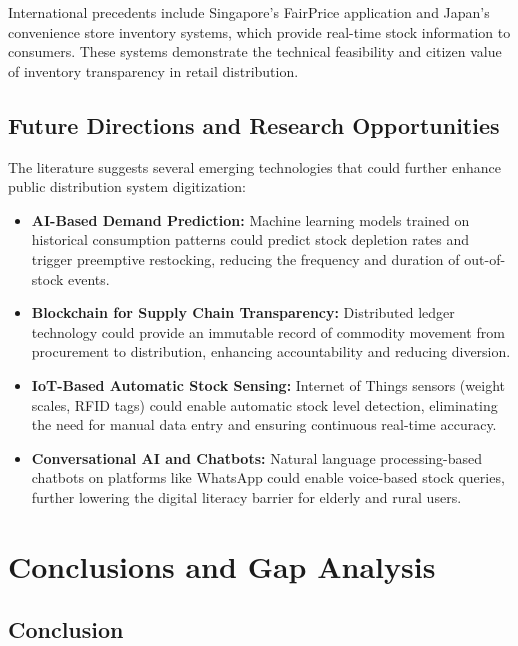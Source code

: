International precedents include Singapore's FairPrice application and Japan's convenience store inventory systems, which provide real-time stock information to consumers. These systems demonstrate the technical feasibility and citizen value of inventory transparency in retail distribution.

\subsection{Future Directions and Research Opportunities}

The literature suggests several emerging technologies that could further enhance public distribution system digitization:

\begin{itemize}
    \item \textbf{AI-Based Demand Prediction:} Machine learning models trained on historical consumption patterns could predict stock depletion rates and trigger preemptive restocking, reducing the frequency and duration of out-of-stock events.

    \item \textbf{Blockchain for Supply Chain Transparency:} Distributed ledger technology could provide an immutable record of commodity movement from procurement to distribution, enhancing accountability and reducing diversion.

    \item \textbf{IoT-Based Automatic Stock Sensing:} Internet of Things sensors (weight scales, RFID tags) could enable automatic stock level detection, eliminating the need for manual data entry and ensuring continuous real-time accuracy.

    \item \textbf{Conversational AI and Chatbots:} Natural language processing-based chatbots on platforms like WhatsApp could enable voice-based stock queries, further lowering the digital literacy barrier for elderly and rural users.
\end{itemize}

\section{Conclusions and Gap Analysis}

\subsection{Conclusion}

